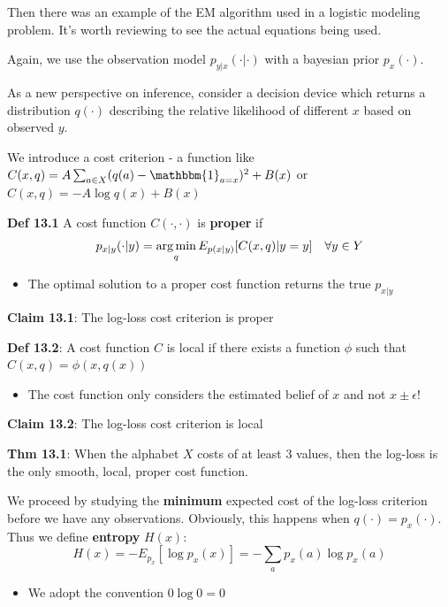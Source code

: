 \documentclass[12pt]{article} %
\begin{document}
Then there was an example of the EM algorithm used in a logistic modeling problem. It's worth reviewing to see the actual equations being used. 


\newpage
{}
Again, we use the observation model $p_{y|x}(\cdot | \cdot)$ with a bayesian prior $p_x(
\cdot)$.

As a new perspective on inference, consider a decision device which returns a distribution $q(
\cdot)$ describing the relative likelihood of different $x$ based on observed $y$.

We introduce a cost criterion - a function like $C(x,q) = A \sum_{a \in X} (q(a) - \mathbbm{1}_{a = x})^2 + B(x)$ or $C(x,q) = - A \log q(x) + B(x)$


\textbf{Def 13.1} A cost function $C(\cdot,\cdot)$ is \textbf{proper} if
\begin{equation*}
    p_{x|y}(\cdot | y) = \operatorname*{arg\,min}_q E_{p(x|y)}[C(x,q) | y = y]  \quad \forall y \in Y
\end{equation*}
\begin{itemize}[topsep=-1pt, itemsep=-1pt]
    \item The optimal solution to a proper cost function returns the true $p_{x|y}$
\end{itemize}

\textbf{Claim 13.1}: The log-loss cost criterion is proper

\textbf{Def 13.2}: A cost function $C$ is local if there exists a function $\phi$ such that $C(x,q) = \phi(x, q(x))$
\begin{itemize}[topsep=-1pt, itemsep=-1pt]
    \item The cost function only considers the estimated belief of $x$ and not $x \pm \epsilon$!
\end{itemize}

\textbf{Claim 13.2}: The log-loss cost criterion is local

\textbf{Thm 13.1}: When the alphabet $X$ costs of at least 3 values, then the log-loss is the only smooth, local, proper cost function.

\separate

We proceed by studying the \textbf{minimum} expected cost of the log-loss criterion before we have any observations. Obviously, this happens when $q(\cdot) = p_x(\cdot)$. Thus we define \textbf{entropy} $H(x)$:
\begin{equation*}
    H(x) = - E_{p_x}[\log p_x(x)] = - \sum_a p_x(a) \log p_x(a)
\end{equation*}
\begin{itemize}[topsep=-1pt, itemsep=-1pt]
    \item We adopt the convention $0 \log 0 = 0$
\end{itemize}
\end{document}
